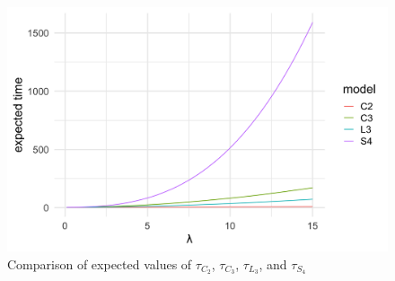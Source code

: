 \begin{figure}[H]
  \centering
    \includegraphics[width=.80\textwidth]{figures/ev_phase_comparison_4.png}
   \caption{Comparison of expected values of $\tau_{C_2}$, $\tau_{C_3}$, $\tau_{L_3}$, and $\tau_{S_4}$}
  \label{fig:ev_phase_comparison_4.png}
\end{figure}
